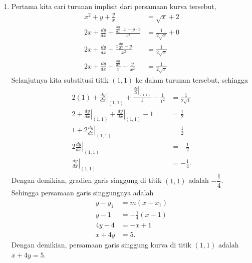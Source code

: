 \documentclass[11pt,openany,a4paper]{article}
\begin{document}
\begin{enumerate}
    \item Pertama kita cari turunan implisit dari persamaan kurva tersebut,
          \begin{align*}
              x^2 + y + \frac{y}{x}                                              & = \sqrt{x} + 2            \\
              2x + \frac{dy}{dx} + \frac{\frac{dy}{dx} \cdot x - y \cdot 1}{x^2} & = \frac{1}{2\sqrt{x}} + 0 \\
              2x + \frac{dy}{dx} + \frac{x \frac{dy}{dx} - y}{x^2}               & = \frac{1}{2\sqrt{x}}     \\
              2x + \frac{dy}{dx} + \frac{\frac{dy}{dx}}{x} - \frac{y}{x^2}       & = \frac{1}{2\sqrt{x}}
          \end{align*}
          Selanjutnya kita substitusi titik $(1,1)$ ke dalam turunan tersebut, sehingga
          \begin{align*}
              2(1) + \left.\frac{dy}{dx}\right|_{(1,1)} + \frac{\left.\frac{dy}{dx}\right|_{(1,1)}}{1} - \frac{1}{1^2} & = \frac{1}{2\sqrt{1}} \\
              2 + \left.\frac{dy}{dx}\right|_{(1,1)} + \left.\frac{dy}{dx}\right|_{(1,1)} - 1                          & = \frac{1}{2}         \\
              1 + 2\left.\frac{dy}{dx}\right|_{(1,1)}                                                                  & = \frac{1}{2}         \\
              2\left.\frac{dy}{dx}\right|_{(1,1)}                                                                      & = -\frac{1}{2}        \\
              \left.\frac{dy}{dx}\right|_{(1,1)}                                                                       & = -\frac{1}{4}.
          \end{align*}
          Dengan demikian, gradien garis singgung di titik $(1,1)$ adalah $-\dfrac{1}{4}$. Sehingga persamaan garis singgungnya adalah
          \begin{align*}
              y - y_1 & = m(x - x_1)          \\
              y - 1   & = -\frac{1}{4}(x - 1) \\
              4y - 4  & = -x + 1              \\
              x + 4y  & = 5.
          \end{align*}
          Dengan demikian, persamaan garis singgung kurva di titik $(1,1)$ adalah $x + 4y = 5$.
\end{enumerate}
\end{document}
